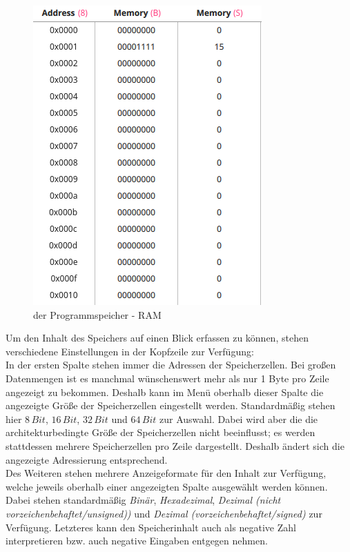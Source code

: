 \begin{figure}[ht]
	\centering
  \includegraphics[scale=1]{Images/Memory}
	\caption{der Programmspeicher - RAM}
	\label{Memory}
\end{figure}

Um den Inhalt des Speichers auf einen Blick erfassen zu können, stehen
verschiedene Einstellungen in der Kopfzeile zur Verfügung:\\ In der ersten Spalte
stehen immer die Adressen der Speicherzellen. Bei großen Datenmengen ist es
manchmal wünschenswert mehr als nur 1 Byte pro Zeile angezeigt zu bekommen.
Deshalb kann im Menü oberhalb dieser Spalte die angezeigte Größe der
Speicherzellen eingestellt werden. Standardmäßig stehen hier $8\, Bit$, $16\,
Bit$, $32\, Bit$ und $64\, Bit$ zur Auswahl. Dabei wird aber die die
architekturbedingte Größe der Speicherzellen nicht beeinflusst; es werden
stattdessen mehrere Speicherzellen pro Zeile dargestellt. Deshalb ändert sich
die angezeigte Adressierung entsprechend.\\ Des Weiteren stehen mehrere
Anzeigeformate für den Inhalt zur Verfügung, welche jeweils oberhalb einer
angezeigten Spalte ausgewählt werden können. Dabei stehen standardmäßig
\textit{Binär}, \textit{Hexadezimal}, \textit{Dezimal (nicht vorzeichenbehaftet/unsigned))} und \textit{Dezimal (vorzeichenbehaftet/signed)} zur Verfügung. Letzteres kann den Speicherinhalt
auch als negative Zahl interpretieren bzw. auch negative Eingaben entgegen
nehmen. \\

